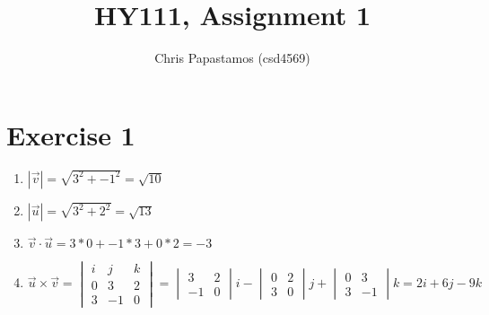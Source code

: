\documentclass{article}
\title{HY111, Assignment 1}
\author{Chris Papastamos (csd4569)}
\begin{document}
\maketitle

\section*{Exercise 1}
\begin{enumerate}
    \item $|\vec{v}|= \sqrt{{3^2}+{-1}^2} = \sqrt{10}$ 
    \item $|\vec{u}|= \sqrt{{3^2}+{2}^2} = \sqrt{13}$ 
    \item $\vec{v}\cdot\vec{u}= 3*0 + -1*3 + 0*2 = -3$
    \item $\vec{u}\times\vec{v} =  \begin{vmatrix}
                                i & j & k\\
                                0 & 3 & 2\\
                                3 & -1 & 0 
                                \end{vmatrix}
                                 = \begin{vmatrix}
                                3 & 2\\
                                -1 & 0 
                                \end{vmatrix}i
                                -
                                \begin{vmatrix}
                                0 & 2\\
                                3 & 0 
                                \end{vmatrix}j
                                +
                                \begin{vmatrix}
                                0 & 3\\
                                3 & -1 
                                \end{vmatrix}k
                                =2i+6j-9k
                                $


\end{enumerate}
\end{document}
